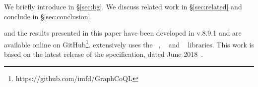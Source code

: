 We briefly introduce \gql in \S\ref{sec:bg}. 
We discuss related work in \S\ref{sec:related} and conclude in \S\ref{sec:conclusion}.

\gcoql and the results presented in this paper have been developed in \coq v.8.9.1 and are available online on GitHub\footnote{https://github.com/imfd/GraphCoQL}.
\gcoql extensively uses the  ~\cite{mathcomp}, \ssreflect~\cite{ssreflect} and \equations~\cite{equations} libraries. 
This work is based on the latest release of the \gql specification, dated June 2018~\cite{gqlspec}.





